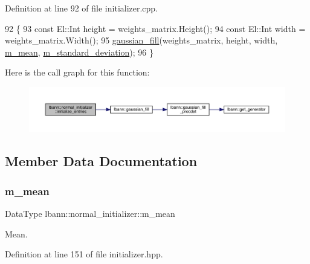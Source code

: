 Definition at line 92 of file initializer.\+cpp.


\begin{DoxyCode}
92                                                                             \{
93   \textcolor{keyword}{const} El::Int height = weights\_matrix.Height();
94   \textcolor{keyword}{const} El::Int width = weights\_matrix.Width();
95   \hyperlink{namespacelbann_abd116f95f55d0e29d9a0cc386139c4b4}{gaussian\_fill}(weights\_matrix, height, width, \hyperlink{classlbann_1_1normal__initializer_a1e431c0576605984c7e56d4ce905632e}{m\_mean}, 
      \hyperlink{classlbann_1_1normal__initializer_a69cebd0d8f6db811c6195a1dac447a3e}{m\_standard\_deviation});
96 \}
\end{DoxyCode}
Here is the call graph for this function\+:\nopagebreak
\begin{figure}[H]
\begin{center}
\leavevmode
\includegraphics[width=350pt]{classlbann_1_1normal__initializer_a3958aa3e88af76077cc7559eba0a5a17_cgraph}
\end{center}
\end{figure}


\subsection{Member Data Documentation}
\mbox{\label{classlbann_1_1normal__initializer_a1e431c0576605984c7e56d4ce905632e}} 
\subsubsection{\texorpdfstring{m\+\_\+mean}{m\_mean}}
{\footnotesize\ttfamily Data\+Type lbann\+::normal\+\_\+initializer\+::m\+\_\+mean\hspace{0.3cm}{\ttfamily [private]}}

Mean. 

Definition at line 151 of file initializer.\+hpp.

\mbox{\label{classlbann_1_1normal__initializer_a69cebd0d8f6db811c6195a1dac447a3e}} 
